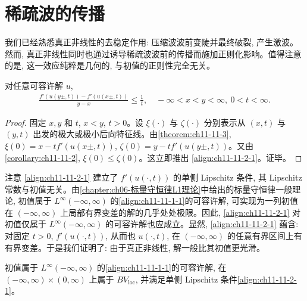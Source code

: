 \documentclass[../../main.tex]{subfiles}
\begin{document}
\section{稀疏波的传播}\label{section:ch11-稀疏波的传播}

我们已经熟悉真正非线性的去稳定作用: 压缩波波前变陡并最终破裂, 产生激波。然而, 真正非线性同时也通过诱导稀疏波波前的传播而施加正则化影响。值得注意的是, 这一效应纯粹是几何的, 与初值的正则性完全无关。

\begin{theorem}\label{theorem:ch11-11-2-1}
对任意可容许解 $u$,
\begin{align}
\frac{f'(u(y\pm,t))-f'(u(x\pm,t))}{y-x}\leqslant\frac{1}{t},\quad -\infty<x<y<\infty,\ 0<t<\infty.\label{align:ch11-11-2-1}
\end{align}
\end{theorem}

\begin{proof}
固定 $x,y$ 和 $t$, $x<y$, $t>0$。设 $\xi(\cdot)$ 与 $\zeta(\cdot)$ 分别表示从 $(x,t)$ 与 $(y,t)$ 出发的极大或极小后向特征线。由\cref{theorem:ch11-11-3}, $\xi(0)=x-tf'(u(x\pm,t))$, $\zeta(0)=y-tf'(u(y\pm,t))$。又由\cref{corollary:ch11-11-2}, $\xi(0)\leqslant\zeta(0)$。这立即推出 \eqref{align:ch11-11-2-1}。证毕。
\end{proof}

注意 \eqref{align:ch11-11-2-1} 建立了 $f'(u(\cdot,t))$ 的单侧 Lipschitz 条件, 其 Lipschitz 常数与初值无关。由\cref{chapter:ch06-标量守恒律L1理论}中给出的标量守恒律一般理论, 初值属于 $L^\infty(-\infty,\infty)$ 的\eqref{align:ch11-11-1-1}的可容许解, 可实现为一列初值在 $(-\infty,\infty)$ 上局部有界变差的解的几乎处处极限。因此, \eqref{align:ch11-11-2-1} 对初值仅属于 $L^\infty(-\infty,\infty)$ 的可容许解也应成立。显然, \eqref{align:ch11-11-2-1} 蕴含: 对固定 $t>0$, $f'(u(\cdot,t))$, 从而也 $u(\cdot,t)$, 在 $(-\infty,\infty)$ 的任意有界区间上有有界变差。于是我们证明了: 由于真正非线性, 解一般比其初值更光滑。


\begin{theorem}\label{theorem:ch11-11-2-2}
初值属于 $L^\infty(-\infty,\infty)$ 的\eqref{align:ch11-11-1-1}的可容许解, 在 $(-\infty,\infty)\times(0,\infty)$ 上属于 $BV_{\mathrm{loc}}$, 并满足单侧 Lipschitz 条件\eqref{align:ch11-11-2-1}。
\end{theorem}
\end{document}
